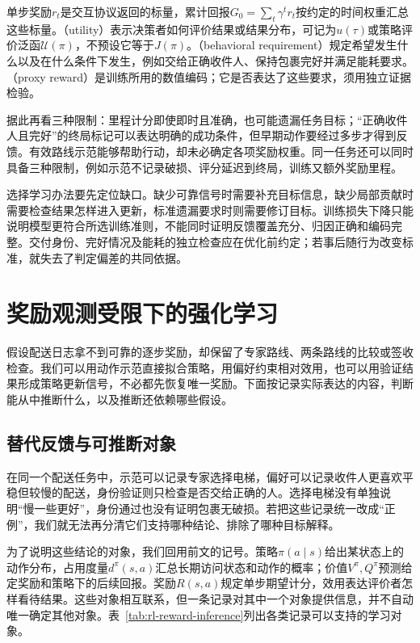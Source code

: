 \begin{definition}[奖励、回报、效用与行为要求]
  \label{def:rl-reward-objective}
  单步奖励$r_t$是交互协议返回的标量，累计回报$G_0=\sum_t\gamma^t r_t$按约定的时间权重汇总这些标量。（utility）表示决策者如何评价结果或结果分布，可记为$u(\tau)$或策略评价泛函$\mathcal U(\pi)$，不预设它等于$J(\pi)$。（behavioral requirement）规定希望发生什么以及在什么条件下发生，例如交给正确收件人、保持包裹完好并满足能耗要求。（proxy reward）是训练所用的数值编码；它是否表达了这些要求，须用独立证据检验。
\end{definition}

据此再看三种限制：里程计分即使即时且准确，也可能遗漏任务目标；“正确收件人且完好”的终局标记可以表达明确的成功条件，但早期动作要经过多步才得到反馈。有效路线示范能够帮助行动，却未必确定各项奖励权重。同一任务还可以同时具备三种限制，例如示范不记录破损、评分延迟到终局，训练又额外奖励里程。

选择学习办法要先定位缺口。缺少可靠信号时需要补充目标信息，缺少局部贡献时需要检查结果怎样进入更新，标准遗漏要求时则需要修订目标。训练损失下降只能说明模型更符合所选训练准则，不能同时证明反馈覆盖充分、归因正确和编码完整。交付身份、完好情况及能耗的独立检查应在优化前约定；若事后随行为改变标准，就失去了判定偏差的共同依据。

\section{奖励观测受限下的强化学习}
\label{sec:rl-reward-alternative}

假设配送日志拿不到可靠的逐步奖励，却保留了专家路线、两条路线的比较或签收检查。我们可以用动作示范直接拟合策略，用偏好约束相对效用，也可以用验证结果形成策略更新信号，不必都先恢复唯一奖励。下面按记录实际表达的内容，判断能从中推断什么，以及推断还依赖哪些假设。

\subsection{替代反馈与可推断对象}
\label{sec:rl-reward-inference}

在同一个配送任务中，示范可以记录专家选择电梯，偏好可以记录收件人更喜欢平稳但较慢的配送，身份验证则只检查是否交给正确的人。选择电梯没有单独说明“慢一些更好”，身份通过也没有证明包裹无破损。若把这些记录统一改成“正例”，我们就无法再分清它们支持哪种结论、排除了哪种目标解释。

为了说明这些结论的对象，我们回用前文的记号。策略$\pi(a\mid s)$给出某状态上的动作分布，占用度量$d^\pi(s,a)$汇总长期访问状态和动作的概率；价值$V^\pi,Q^\pi$预测给定奖励和策略下的后续回报。奖励$R(s,a)$规定单步期望计分，效用表达评价者怎样看待结果。这些对象相互联系，但一条记录对其中一个对象提供信息，并不自动唯一确定其他对象。表~\ref{tab:rl-reward-inference}列出各类记录可以支持的学习对象。

